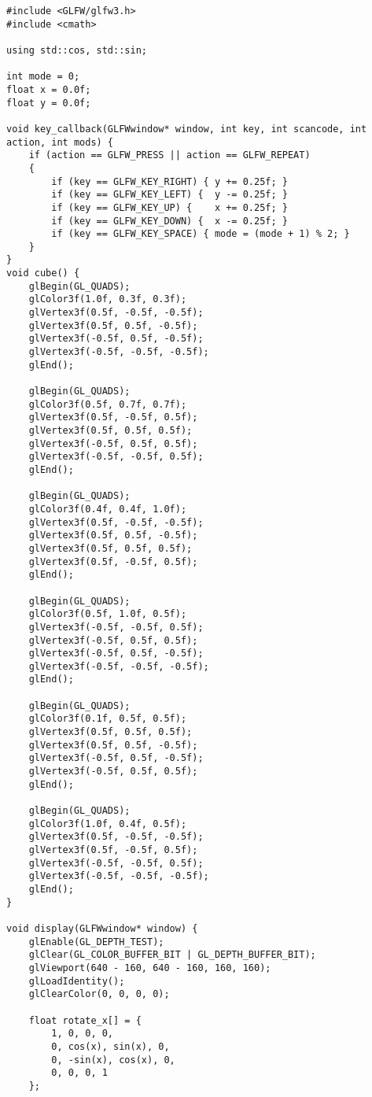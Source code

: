 \documentclass[a4paper, 14pt]{extarticle}
\begin{document}
\begin{verbatim}
#include <GLFW/glfw3.h>
#include <cmath>

using std::cos, std::sin;

int mode = 0;
float x = 0.0f;
float y = 0.0f;

void key_callback(GLFWwindow* window, int key, int scancode, int action, int mods) {
    if (action == GLFW_PRESS || action == GLFW_REPEAT)
    {
        if (key == GLFW_KEY_RIGHT) { y += 0.25f; }
        if (key == GLFW_KEY_LEFT) {  y -= 0.25f; }
        if (key == GLFW_KEY_UP) {    x += 0.25f; }
        if (key == GLFW_KEY_DOWN) {  x -= 0.25f; }
        if (key == GLFW_KEY_SPACE) { mode = (mode + 1) % 2; }
    }
}
void cube() {
    glBegin(GL_QUADS);
    glColor3f(1.0f, 0.3f, 0.3f);
    glVertex3f(0.5f, -0.5f, -0.5f);
    glVertex3f(0.5f, 0.5f, -0.5f);
    glVertex3f(-0.5f, 0.5f, -0.5f);
    glVertex3f(-0.5f, -0.5f, -0.5f);
    glEnd();

    glBegin(GL_QUADS);
    glColor3f(0.5f, 0.7f, 0.7f);
    glVertex3f(0.5f, -0.5f, 0.5f);
    glVertex3f(0.5f, 0.5f, 0.5f);
    glVertex3f(-0.5f, 0.5f, 0.5f);
    glVertex3f(-0.5f, -0.5f, 0.5f);
    glEnd();

    glBegin(GL_QUADS);
    glColor3f(0.4f, 0.4f, 1.0f);
    glVertex3f(0.5f, -0.5f, -0.5f);
    glVertex3f(0.5f, 0.5f, -0.5f);
    glVertex3f(0.5f, 0.5f, 0.5f);
    glVertex3f(0.5f, -0.5f, 0.5f);
    glEnd();

    glBegin(GL_QUADS);
    glColor3f(0.5f, 1.0f, 0.5f);
    glVertex3f(-0.5f, -0.5f, 0.5f);
    glVertex3f(-0.5f, 0.5f, 0.5f);
    glVertex3f(-0.5f, 0.5f, -0.5f);
    glVertex3f(-0.5f, -0.5f, -0.5f);
    glEnd();

    glBegin(GL_QUADS);
    glColor3f(0.1f, 0.5f, 0.5f);
    glVertex3f(0.5f, 0.5f, 0.5f);
    glVertex3f(0.5f, 0.5f, -0.5f);
    glVertex3f(-0.5f, 0.5f, -0.5f);
    glVertex3f(-0.5f, 0.5f, 0.5f);
    glEnd();

    glBegin(GL_QUADS);
    glColor3f(1.0f, 0.4f, 0.5f);
    glVertex3f(0.5f, -0.5f, -0.5f);
    glVertex3f(0.5f, -0.5f, 0.5f);
    glVertex3f(-0.5f, -0.5f, 0.5f);
    glVertex3f(-0.5f, -0.5f, -0.5f);
    glEnd();
}

void display(GLFWwindow* window) {
    glEnable(GL_DEPTH_TEST);
    glClear(GL_COLOR_BUFFER_BIT | GL_DEPTH_BUFFER_BIT);
    glViewport(640 - 160, 640 - 160, 160, 160);
    glLoadIdentity();
    glClearColor(0, 0, 0, 0);

    float rotate_x[] = {
        1, 0, 0, 0,
        0, cos(x), sin(x), 0,
        0, -sin(x), cos(x), 0,
        0, 0, 0, 1
    };


\end{verbatim}
\end{document}
